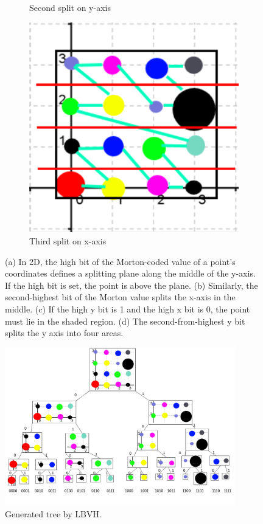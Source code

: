 \documentclass[11pt,a4paper]{article}
\begin{document}
\begin{figure}[H]
\begin{subfigure}[b]{0.3\textwidth}
         \caption{Second split on y-axis}
         \label{fig:pi_5000}
     \end{subfigure}
     \hfill
     \begin{subfigure}[b]{0.3\textwidth}
         \centering
         \includegraphics[width=\textwidth]{images/example_lbvh/03.png}
         \caption{Third split on x-axis}
         \label{fig:pi_18000}
     \end{subfigure}
        \caption{(a) In 2D, the high bit of the Morton-coded value of a point’s coordinates defines a splitting plane along the middle of the y-axis. If the high bit is set, the point is above the plane. (b) Similarly, the second-highest bit of the Morton value splits the x-axis in the middle. (c) If the high y bit is 1 and the high x bit is 0, the point must lie in the shaded region. (d) The second-from-highest y bit splits the y axis into four areas. }
        \label{fig:three graphs}
\end{figure}



\begin{figure}[h]	
     \centering
         \includegraphics[width=10cm]{images/example_lbvh/tree.png}
        \caption{Generated tree by LBVH.}
        \label{fig:dice}
\end{figure}
\end{document}
